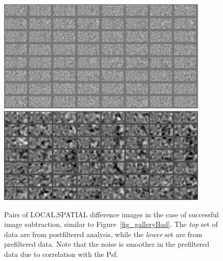 \documentclass[prd, nofootinbib, floatfix, 11pt,tightenlines,times]{article}
\begin{document}
\begin{figure}
\begin{center}
\includegraphics[width=0.9\textwidth]{figures/normal2.eps} \\
\includegraphics[width=0.9\textwidth]{figures/preconv2.eps} \\
\end{center}
\caption{Pairs of LOCAL,SPATIAL difference images in the case of
  successful image subtraction, similar to
  Figure~\ref{fig_galleryBad}.  The {\it top} set of data are from
  postfiltered analysis, while the {\it lower} set are from
  prefiltered data.  Note that the noise is smoother in the
  prefiltered data due to correlation with the Psf. }
\label{fig_galleryGood}
\end{figure}
\end{document}
